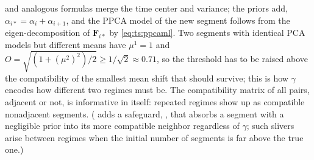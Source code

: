 and analogous formulas merge the time center and variance; the priors add, $\alpha_{i*}=\alpha_i+\alpha_{i+1}$, and the PPCA model of the new segment follows from the eigen-decomposition of $\mathbf{F}_{i*}$ by \eqref{eq:ts:ppcaml}. Two segments with identical PCA models but different means have $\mu^1=1$ and $O=\sqrt{(1+(\mu^2)^2)/2}\ge1/\sqrt2\approx0.71$, so the threshold has to be raised above the compatibility of the smallest mean shift that should survive; this is how $\gamma$ encodes how different two regimes must be. The compatibility matrix of all pairs, adjacent or not, is informative in itself: repeated regimes show up as compatible nonadjacent segments. ( adds a safeguard, , that absorbs a segment with a negligible prior into its more compatible neighbor regardless of $\gamma$; such slivers arise between regimes when the initial number of segments is far above the true one.)

